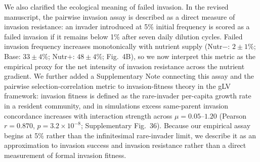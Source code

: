 We also clarified the ecological meaning of failed invasion. In the revised manuscript, the pairwise invasion assay is described as a direct measure of invasion resistance: an invader introduced at 5\% initial frequency is scored as a failed invasion if it remains below 1\% after seven daily dilution cycles. Failed invasion frequency increases monotonically with nutrient supply (Nutr$-$: $2 \pm 1\%$; Base: $33 \pm 4\%$; Nutr$+$: $48 \pm 4\%$; Fig.~4B), so we now interpret this metric as the empirical proxy for the net intensity of invasion resistance across the nutrient gradient. We further added a Supplementary Note connecting this assay and the pairwise selection-correlation metric to invasion-fitness theory in the gLV framework: invasion fitness is defined as the rare-invader per-capita growth rate in a resident community, and in simulations excess same-parent invasion concordance increases with interaction strength across $\mu = 0.05$--$1.20$ (Pearson $r = 0.870$, $p = 3.2 \times 10^{-8}$; Supplementary Fig.~36). Because our empirical assay begins at 5\% rather than the infinitesimal rare-invader limit, we describe it as an approximation to invasion success and invasion resistance rather than a direct measurement of formal invasion fitness.


